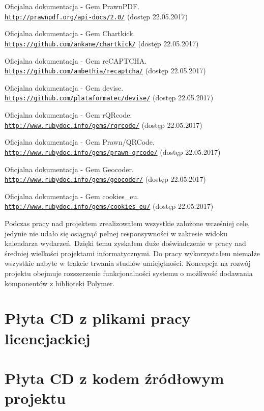 \documentclass[openright]{xmgr}
\begin{document}
\begin{thebibliography}{9}
Oficjalna dokumentacja - Gem PrawnPDF.
\\\texttt{\url{http://prawnpdf.org/api-docs/2.0/}} (dostęp 22.05.2017)

Oficjalna dokumentacja - Gem Chartkick.
\\\texttt{\url{https://github.com/ankane/chartkick/}} (dostęp 22.05.2017)

Oficjalna dokumentacja - Gem reCAPTCHA.
\\\texttt{\url{https://github.com/ambethia/recaptcha/}} (dostęp 22.05.2017)

Oficjalna dokumentacja - Gem devise.
\\\texttt{\url{https://github.com/plataformatec/devise/}} (dostęp 22.05.2017)

Oficjalna dokumentacja - Gem rQRcode.
\\\texttt{\url{http://www.rubydoc.info/gems/rqrcode/}} (dostęp 22.05.2017)

Oficjalna dokumentacja - Gem Prawn/QRCode.
\\\texttt{\url{http://www.rubydoc.info/gems/prawn-qrcode/}} (dostęp 22.05.2017)

Oficjalna dokumentacja - Gem Geocoder.
\\\texttt{\url{http://www.rubydoc.info/gems/geocoder/}} (dostęp 22.05.2017)

Oficjalna dokumentacja - Gem cookies\_eu.
\\\texttt{\url{http://www.rubydoc.info/gems/cookies_eu/}} (dostęp 22.05.2017)

\end{thebibliography}


\summary
Podczas pracy nad projektem zrealizowałem wszystkie założone wcześniej cele, jedynie nie udało się osiągnąć pełnej responsywności w zakresie widoku kalendarza wydarzeń. Dzięki temu zyskałem duże doświadczenie w pracy nad średniej wielkości projektami informatycznymi. Do pracy wykorzystałem niemalże wszystkie nabyte w trakcie trwania studiów umiejętności. Koncepcja na rozwój projektu obejmuje rozszerzenie funkcjonalności systemu o możliwość dodawania komponentów z biblioteki Polymer.

\appendix

\chapter{Płyta CD z plikami pracy licencjackiej}

\chapter{Płyta CD z kodem źródłowym projektu}

\listoffigures

\lstlistoflistings
{}%

\oswiadczenie
\end{document}
